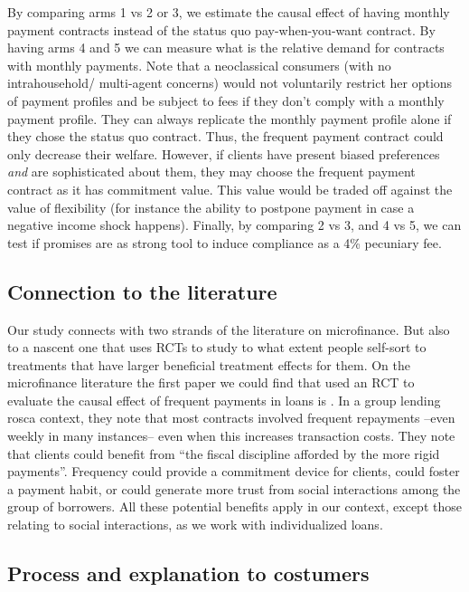 \documentclass[11pt]{article}
\begin{document}
By comparing arms 1 vs 2 or 3, we estimate the causal effect of having monthly payment contracts instead of the status quo pay-when-you-want contract. By having arms 4 and 5 we can measure what is the relative demand for contracts with monthly payments. Note that a neoclassical consumers (with no intrahousehold/ multi-agent concerns) would not voluntarily restrict her options of payment profiles and be subject to fees if they don't comply with a monthly payment profile. They can always replicate the monthly payment profile alone if they chose the status quo contract. Thus, the frequent payment contract could only decrease their welfare. However, if clients have present biased preferences \textit{and} are sophisticated about them, they may choose the frequent payment contract as it has commitment value. This value would be traded off against the value of flexibility (for instance the ability to postpone payment in case a negative income shock happens). Finally, by comparing 2 vs 3, and 4 vs 5, we can test if promises are as strong tool to induce compliance as a 4\% pecuniary fee. 


    \subsection{Connection to the literature}
    
    Our study connects with two strands of the literature on microfinance. But also to a nascent one that uses RCTs to study to what extent people self-sort to treatments that have larger beneficial treatment effects for them. On the microfinance literature the first paper we could find that used an RCT to evaluate the causal effect of frequent payments in loans is \cite{Pande}. In a group lending rosca context, they note that most contracts involved frequent repayments --even weekly in many instances-- even when this increases transaction costs. They note that clients could benefit from ``the fiscal discipline afforded by the more rigid payments''. Frequency could provide a commitment device for clients, could foster a payment habit, or could generate more trust from social interactions among the group of borrowers. All these potential benefits apply in our context, except those relating to social interactions, as we work with individualized loans.
    
    
    

\subsection{Process and explanation to costumers}
\end{document}
